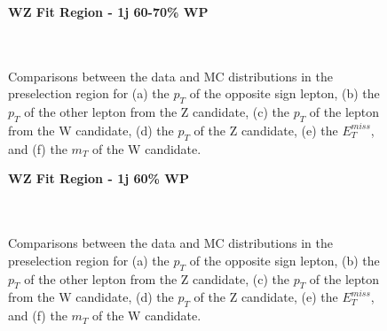 \begin{figure}[H]
    \centering
    \textbf{WZ Fit Region - 1j 60-70\% WP}\\
    \\
    \\
    \caption{Comparisons between the data and MC distributions in the preselection region for (a) the $p_T$ of the opposite sign lepton, (b) the $p_T$ of the other lepton from the Z candidate, (c) the $p_T$ of the lepton from the W candidate, (d) the $p_T$ of the Z candidate, (e) the $E_T^{miss}$, and (f) the $m_T$ of the W candidate.}
    \label{kin:WP_1j_60_70}
\end{figure}

\begin{figure}[H]
    \centering
    \textbf{WZ Fit Region - 1j 60\% WP}\\
     \\
    \\
    \caption{Comparisons between the data and MC distributions in the preselection region for (a) the $p_T$ of the opposite sign lepton, (b) the $p_T$ of the other lepton from the Z candidate, (c) the $p_T$ of the lepton from the W candidate, (d) the $p_T$ of the Z candidate, (e) the $E_T^{miss}$, and (f) the $m_T$ of the W candidate.}
    \label{kin:WP_1j_60}    
\end{figure}

